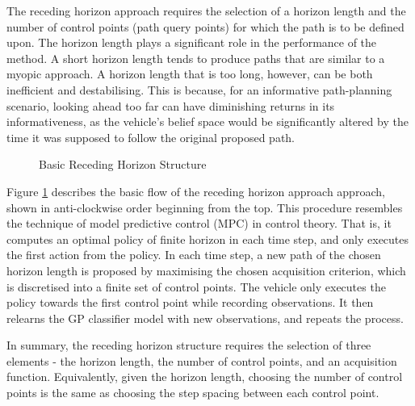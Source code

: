 			The receding horizon approach requires the selection of a horizon length and the number of control points (path query points) for which the path is to be defined upon. The horizon length plays a significant role in the performance of the method. A short horizon length tends to produce paths that are similar to a myopic approach. A horizon length that is too long, however, can be both inefficient and destabilising. This is because, for an informative path-planning scenario, looking ahead too far can have diminishing returns in its informativeness, as the vehicle's belief space would be significantly altered by the time it was supposed to follow the original proposed path.
	
			\begin{figure}
				\begin{center}
				\end{center}
			\caption{Basic Receding Horizon Structure}
			\label{Figure:RecedingHorizonMethodOutline}
			\end{figure}
					
			Figure \ref{Figure:RecedingHorizonMethodOutline} describes the basic flow of the receding horizon approach approach, shown in anti-clockwise order beginning from the top. This procedure resembles the technique of model predictive control (MPC) in control theory. That is, it computes an optimal policy of finite horizon in each time step, and only executes the first action from the policy. In each time step, a new path of the chosen horizon length is proposed by maximising the chosen acquisition criterion, which is discretised into a finite set of control points. The vehicle only executes the policy towards the first control point while recording observations. It then relearns the GP classifier model with new observations, and repeats the process.
	
			In summary, the receding horizon structure requires the selection of three elements - the horizon length, the number of control points, and an acquisition function. Equivalently, given the horizon length, choosing the number of control points is the same as choosing the step spacing between each control point. 
			
